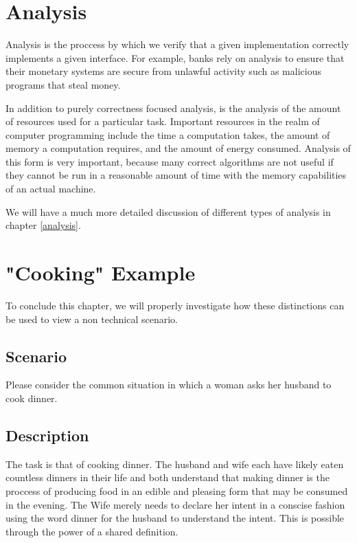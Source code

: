 \documentclass[12pt, letterpaper]{book}
\begin{document}
	\section{Analysis}

	Analysis is the proccess by which we verify that a given implementation correctly implements a given interface. For example, banks rely on analysis to ensure that their monetary systems are secure from unlawful activity such as malicious programs that steal money.

	In addition to purely correctness focused analysis, is the analysis of the amount of resources used for a particular task. Important resources in the realm of computer programming include the time a computation takes, the amount of memory a computation requires, and the amount of energy consumed. Analysis of this form is very important, because many correct algorithms are not useful if they cannot be run in a reasonable amount of time with the memory capabilities of an actual machine.

We will have a much more detailed discussion of different types of analysis in chapter \ref{analysis}.

	\section{"Cooking" Example}

To conclude this chapter, we will properly investigate how these distinctions can be used to view a non technical scenario.

	\subsection{Scenario}

	Please consider the common situation in which a woman asks her husband to cook dinner.

	\subsection{Description}

	The task is that of cooking dinner. The husband and wife each have likely eaten countless dinners in their life and both understand that making dinner is the proccess of producing food in an edible and pleasing form that may be consumed in the evening. The Wife merely needs to declare her intent in a conscise fashion using the word dinner for the husband to understand the intent. This is possible through the power of a shared definition.
\end{document}
